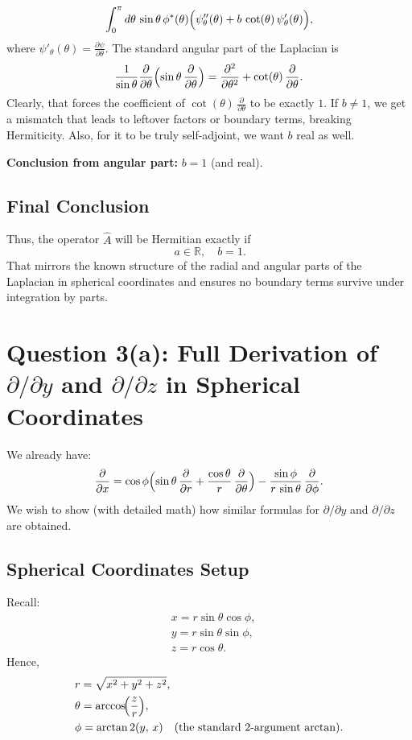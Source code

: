 \documentclass[12pt]{article}
\begin{document}
\[
\int_0^\pi d\theta\,\sin\theta\,\phi^*(\theta)\Bigl(\psi''_{\theta}(\theta) + b\,\cot(\theta)\,\psi'_{\theta}(\theta)\Bigr),
\]
where \(\psi'_{\theta}(\theta)=\tfrac{\partial\psi}{\partial \theta}\).
The standard angular part of the Laplacian is
\begin{equation}
\frac{1}{\sin\theta}\frac{\partial}{\partial \theta}\Bigl(\sin\theta\,\frac{\partial}{\partial \theta}\Bigr)
=
\frac{\partial^2}{\partial \theta^2}
+
\cot(\theta)\,\frac{\partial}{\partial \theta}.
\end{equation}
Clearly, that forces the coefficient of \(\cot(\theta)\,\tfrac{\partial}{\partial \theta}\) to be exactly \(1\). If \(b\neq 1\), we get a mismatch that leads to leftover factors or boundary terms, breaking Hermiticity. Also, for it to be truly self-adjoint, we want \(b\) real as well.

\textbf{Conclusion from angular part:} \(b = 1\) (and real).

\subsection*{Final Conclusion}
Thus, the operator \(\hat{A}\) will be Hermitian exactly if
\begin{equation}
\boxed{\,a \in \mathbb{R}, \quad b = 1.}
\end{equation}
That mirrors the known structure of the radial and angular parts of the Laplacian in spherical coordinates and ensures no boundary terms survive under integration by parts.





\section*{Question 3(a): Full Derivation of \texorpdfstring{$\partial/\partial y$ and $\partial/\partial z$}{partial wrt y,z} in Spherical Coordinates}

We already have:
\[
\frac{\partial}{\partial x} = \cos\phi \Bigl(\sin\theta\,\frac{\partial}{\partial r} + \frac{\cos\theta}{r}\,\frac{\partial}{\partial \theta}\Bigr)
- \frac{\sin\phi}{r\,\sin\theta}\,\frac{\partial}{\partial \phi}.
\]
We wish to show (with detailed math) how similar formulas for $\partial/\partial y$ and $\partial/\partial z$ are obtained.

\subsection*{Spherical Coordinates Setup}
Recall:
\begin{align*}
& x = r\sin\theta\cos\phi,\\
& y = r\sin\theta\sin\phi,\\
& z = r\cos\theta.
\end{align*}
Hence,
\begin{align*}
& r = \sqrt{x^2 + y^2 + z^2},\\
& \theta = \arccos\!\Bigl(\frac{z}{r}\Bigr),\\
& \phi = \arctan2(y,\,x)\quad(\text{the standard 2-argument arctan}).
\end{align*}
\end{document}
